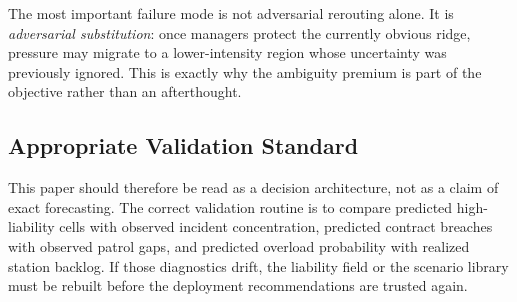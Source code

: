 The most important failure mode is not adversarial rerouting alone. It is \emph{adversarial substitution}: once managers protect the currently obvious ridge, pressure may migrate to a lower-intensity region whose uncertainty was previously ignored. This is exactly why the ambiguity premium is part of the objective rather than an afterthought.

\subsection{Appropriate Validation Standard}
This paper should therefore be read as a decision architecture, not as a claim of exact forecasting. The correct validation routine is to compare predicted high-liability cells with observed incident concentration, predicted contract breaches with observed patrol gaps, and predicted overload probability with realized station backlog. If those diagnostics drift, the liability field or the scenario library must be rebuilt before the deployment recommendations are trusted again.

